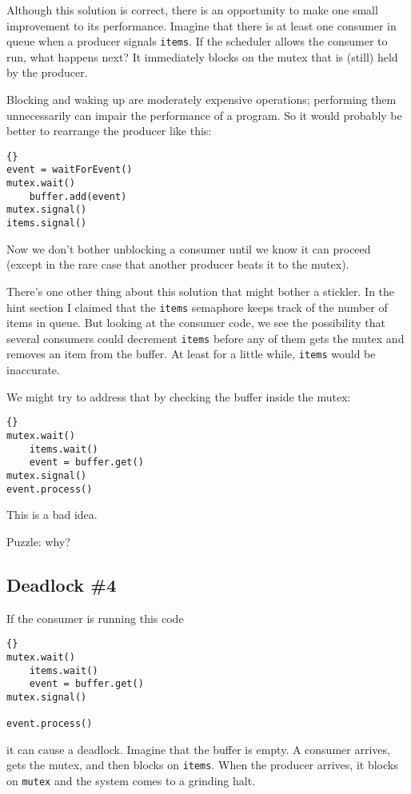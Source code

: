 \documentclass{book}
\newcommand{\clearemptydoublepage}{\newpage\cleardoublepage}
\begin{document}
Although this solution is correct, there is an opportunity
to make one small improvement to its performance.  Imagine
that there is at least one consumer in queue when a producer
signals {\tt items}.  If the scheduler allows the consumer
to run, what happens next?  It immediately blocks on the
mutex that is (still) held by the producer.

Blocking and waking up are moderately expensive operations;
performing them unnecessarily can impair the performance of
a program.  So it would probably be better to rearrange the
producer like this:

\begin{lstlisting}[title={Improved producer solution}]{}
event = waitForEvent()
mutex.wait()
    buffer.add(event)
mutex.signal()
items.signal()
\end{lstlisting}

Now we don't bother unblocking a consumer until we know it can proceed
(except in the rare case that another producer beats it to the mutex).

There's one other thing about this solution that might bother
a stickler.  In the hint section I claimed that the {\tt items}
semaphore keeps track of the number of items in queue.  But looking
at the consumer code, we see the possibility that several consumers
could decrement {\tt items} before any of them gets the mutex
and removes an item from the buffer.  At least for a little while,
{\tt items} would be inaccurate.

We might try to address that by checking the buffer inside the
mutex:

\begin{lstlisting}[title={Broken consumer solution}]{}
mutex.wait()
    items.wait()
    event = buffer.get()
mutex.signal()
event.process()
\end{lstlisting}

This is a bad idea.

Puzzle: why?


\clearemptydoublepage
\subsection{Deadlock \#4}

If the consumer is running this code

\begin{lstlisting}[title={Broken consumer solution}]{}
mutex.wait()
    items.wait()
    event = buffer.get()
mutex.signal()

event.process()
\end{lstlisting}
%
it can cause a deadlock.  Imagine that the buffer is empty.
A consumer arrives, gets the mutex, and then blocks on
{\tt items}.  When the producer arrives, it blocks on
{\tt mutex} and the system comes to a grinding halt.
\end{document}
